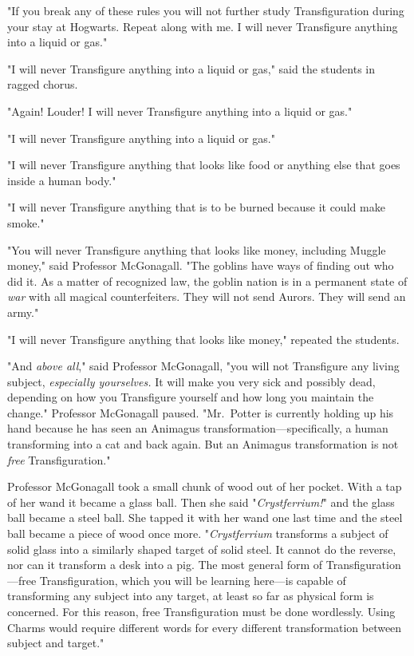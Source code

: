 "If you break any of these rules you will not further study Transfiguration
during your stay at Hogwarts. Repeat along with me. I will never Transfigure
anything into a liquid or gas."

"I will never Transfigure anything into a liquid or gas," said the students in
ragged chorus.

"Again! Louder! I will never Transfigure anything into a liquid or gas."

"I will never Transfigure anything into a liquid or gas."

"I will never Transfigure anything that looks like food or anything else that
goes inside a human body."

"I will never Transfigure anything that is to be burned because it could make
smoke."

"You will never Transfigure anything that looks like money, including Muggle
money," said Professor McGonagall. "The goblins have ways of finding out who
did it. As a matter of recognized law, the goblin nation is in a permanent
state of \emph{war} with all magical counterfeiters. They will not send Aurors.
They will send an army."

"I will never Transfigure anything that looks like money," repeated the
students.

"And \emph{above all}," said Professor McGonagall, "you will not Transfigure
any living subject, \emph{especially yourselves.} It will make you very sick
and possibly dead, depending on how you Transfigure yourself and how long you
maintain the change." Professor McGonagall paused. "Mr.~Potter is currently
holding up his hand because he has seen an Animagus
transformation—specifically, a human transforming into a cat and back again.
But an Animagus transformation is not \emph{free} Transfiguration."

Professor McGonagall took a small chunk of wood out of her pocket. With a tap
of her wand it became a glass ball. Then she said "\emph{Crystferrium!}" and
the glass ball became a steel ball. She tapped it with her wand one last time
and the steel ball became a piece of wood once more. "\emph{Crystferrium}
transforms a subject of solid glass into a similarly shaped target of solid
steel. It cannot do the reverse, nor can it transform a desk into a pig. The
most general form of Transfiguration—free Transfiguration, which you will be
learning here—is capable of transforming any subject into any target, at
least so far as physical form is concerned. For this reason, free
Transfiguration must be done wordlessly. Using Charms would require different
words for every different transformation between subject and target."

